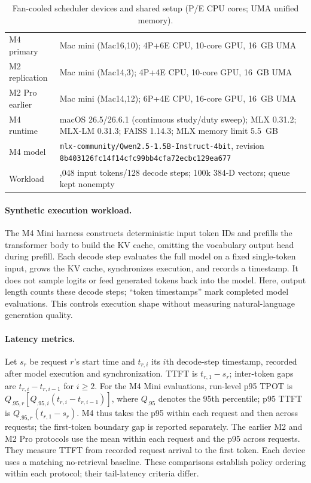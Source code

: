 \documentclass{article}
\begin{document}
\begin{table}[h]
  \caption{Fan-cooled scheduler devices and shared setup (P/E CPU cores; UMA unified memory).}
  \label{tab:setup}
  \centering
  \footnotesize
  \setlength{\tabcolsep}{3.2pt}
  \begin{tabular}{
    >{\raggedright\arraybackslash}m{2.30cm}
    >{\raggedright\arraybackslash}m{11.1cm}
  }
    \toprule
    M4 primary & Mac mini (Mac16,10); 4P+6E CPU, 10-core GPU, 16~GB UMA \\
    M2 replication & Mac mini (Mac14,3); 4P+4E CPU, 10-core GPU, 16~GB UMA \\
    M2 Pro earlier & Mac mini (Mac14,12); 6P+4E CPU, 16-core GPU, 16~GB UMA \\
    M4 runtime & macOS 26.5/26.6.1 (continuous study/duty sweep); MLX 0.31.2; MLX-LM 0.31.3; FAISS 1.14.3; MLX memory limit 5.5~GB \\
    M4 model & \texttt{mlx-community/Qwen2.5-1.5B-Instruct-4bit}, revision \texttt{8b403126fc14f14cfc99bb4cfa72ecbc129ea677} \\
    Workload & 2,048 input tokens/128 decode steps; 100k 384-D vectors; queue kept nonempty \\
    \bottomrule
  \end{tabular}
\end{table}

\paragraph{Synthetic execution workload.}
The M4 Mini harness constructs deterministic input token IDs and prefills the transformer body to build the KV cache, omitting the vocabulary output head during prefill.
Each decode step evaluates the full model on a fixed single-token input, grows the KV cache, synchronizes execution, and records a timestamp.
It does not sample logits or feed generated tokens back into the model.
Here, output length counts these decode steps; ``token timestamps'' mark completed model evaluations.
This controls execution shape without measuring natural-language generation quality.

\paragraph{Latency metrics.}
Let $s_r$ be request $r$'s start time and $t_{r,i}$ its $i$th decode-step timestamp, recorded after model execution and synchronization.
TTFT is $t_{r,1}-s_r$; inter-token gaps are $t_{r,i}-t_{r,i-1}$ for $i\geq2$.
For the M4 Mini evaluations, run-level p95 TPOT is $Q_{.95,r}[Q_{.95,i}(t_{r,i}-t_{r,i-1})]$, where $Q_{.95}$ denotes the 95th percentile; p95 TTFT is $Q_{.95,r}(t_{r,1}-s_r)$.
M4 thus takes the p95 within each request and then across requests; the first-token boundary gap is reported separately.
The earlier M2 and M2 Pro protocols use the mean within each request and the p95 across requests.
They measure TTFT from recorded request arrival to the first token.
Each device uses a matching no-retrieval baseline.
These comparisons establish policy ordering within each protocol; their tail-latency criteria differ.
\end{document}
